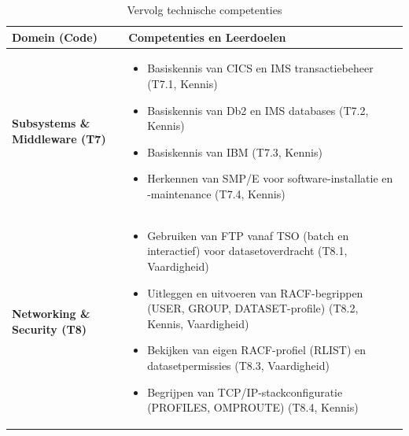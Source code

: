 \begin{table}[H]
	\centering
	\renewcommand{\arraystretch}{1.3}
	\begin{tabularx}{\textwidth}{|>{\bfseries\arraybackslash}p{3.5cm}|X|}
		\hline
		\textbf{Domein (Code)} & \textbf{Competenties en Leerdoelen} \\
		\hline
		Subsystems \& Middleware (T7) &
		\begin{itemize}
			\item Basiskennis van CICS en IMS transactiebeheer (T7.1, Kennis)
			\item Basiskennis van Db2 en IMS databases (T7.2, Kennis)
			\item Basiskennis van IBM (T7.3, Kennis)
			\item Herkennen van SMP/E voor software-installatie en -maintenance (T7.4, Kennis)
		\end{itemize} \\
		\hline
		Networking \& Security (T8) &
		\begin{itemize}
			\item Gebruiken van FTP vanaf TSO (batch en interactief) voor datasetoverdracht (T8.1, Vaardigheid)
			\item Uitleggen en uitvoeren van RACF-begrippen (USER, GROUP, DATASET-profile) (T8.2, Kennis, Vaardigheid)
			\item Bekijken van eigen RACF-profiel (RLIST) en datasetpermissies (T8.3, Vaardigheid)
			\item Begrijpen van TCP/IP-stackconfiguratie (PROFILES, OMPROUTE) (T8.4, Kennis)
		\end{itemize} \\
		\hline
	\end{tabularx}
	\caption{Vervolg technische competenties}
	\label{tab:tech-competenties3}
\end{table}


